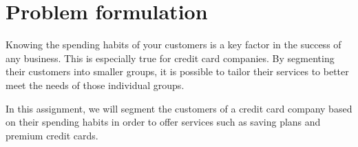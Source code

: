 \section{Problem formulation}

Knowing the spending habits of your customers is a key factor in the success of any business. This is especially true for credit card companies. By segmenting their customers into smaller groups, it is possible to tailor their services to better meet the needs of those individual groups. 
\par
In this assignment, we will segment the customers of a credit card company based on their spending habits in order to offer services such as saving plans and premium credit cards.